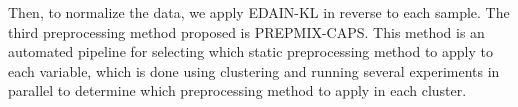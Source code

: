\documentclass{statsmsc}
\begin{document}
{%
Then, to normalize the data, we apply \ac{EDAIN-KL} in reverse to each sample.
The third preprocessing method proposed is \ac{PREPMIX-CAPS}.
This method is an automated pipeline for selecting which static preprocessing method to apply
to each variable, which is done using clustering and running several experiments in parallel to
determine which preprocessing method to apply in each cluster.

}
\end{document}
